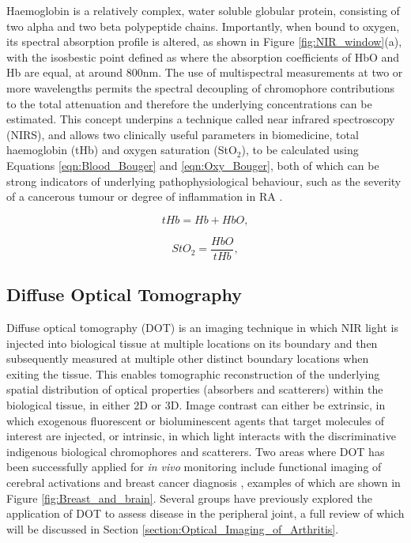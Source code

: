 \documentclass[twoside]{bhamthesis}
\theoremstyle{definition}
\begin{document}
Haemoglobin is a relatively complex, water soluble globular protein, consisting of two alpha and two beta polypeptide chains. Importantly, when bound to oxygen, its spectral absorption profile is altered, as shown in Figure \ref{fig:NIR_window}(a), with the isosbestic point defined as where the absorption coefficients of HbO and Hb are equal, at around 800nm. The use of multispectral measurements at two or more wavelengths permits the spectral decoupling of chromophore contributions to the total attenuation and therefore the underlying concentrations can be estimated. This concept underpins a technique called near infrared spectroscopy (NIRS), and allows two clinically useful parameters in biomedicine, total haemoglobin (tHb) and oxygen saturation (StO$_2$), to be calculated using Equations \ref{eqn:Blood_Bouger} and \ref{eqn:Oxy_Bouger}, both of which can be strong indicators of underlying pathophysiological behaviour, such as the severity of a cancerous tumour \cite{harris2002hypoxia} or degree of inflammation in RA \cite{konisti2012hypoxia}.

\begin{figure}[!ht]
	\begin{minipage}{.5\textwidth}
   \begin{equation}
	tHb = Hb + HbO,
  	\label{eqn:Blood_Bouger}
    \end{equation} 
  \end{minipage}%
  \begin{minipage}{.5\textwidth}
    \begin{equation}
	StO_2 = \frac{HbO}{tHb},
  	\label{eqn:Oxy_Bouger}
    \end{equation}
  \end{minipage}
\end{figure}

\subsection{Diffuse Optical Tomography}

Diffuse optical tomography (DOT) is an imaging technique in which NIR light is injected into biological tissue at multiple locations on its boundary and then subsequently measured at multiple other distinct boundary locations when exiting the tissue. This enables tomographic reconstruction of the underlying spatial distribution of optical properties (absorbers and scatterers) within the biological tissue, in either 2D or 3D. Image contrast can either be extrinsic, in which exogenous fluorescent or bioluminescent agents that target molecules of interest are injected, or intrinsic, in which light interacts with the discriminative indigenous biological chromophores and scatterers. Two areas where DOT has been successfully applied for \textit{in vivo} monitoring include functional imaging of cerebral activations \cite{boas2004diffuse,eggebrecht2012quantitative} and breast cancer diagnosis \cite{srinivasan2003interpreting,carpenter2007image}, examples of which are shown in Figure
\ref{fig:Breast_and_brain}. Several groups have previously explored the application of DOT to assess disease in the peripheral joint, a full review of which will be discussed in Section \ref{section:Optical_Imaging_of_Arthritis}.
\end{document}
